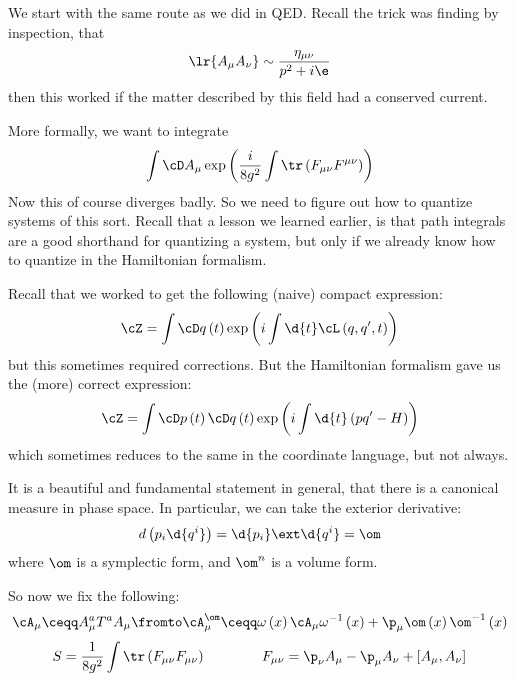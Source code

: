 \documentclass{booc}
\begin{document}
We start with the same route as we did in QED.
Recall the trick was finding by inspection, that 
\begin{equation}
\lr{A_\mu A_\nu} \sim
\frac{\eta_{\mu\nu}}{p^2 + i\e}
\end{equation}
then this worked if the matter described by this field 
had a conserved current.

More formally, we want to integrate
\begin{equation}
\int \cD A_\mu \exp\left( 
\frac{i}{8g^2} \int \tr\left( F_{\mu\nu}F^{\mu\nu} \right)
\right)
\end{equation}
Now this of course diverges badly. 
So we need to figure out how to quantize systems of this sort. 
Recall that a lesson we learned earlier, is that path integrals
are a good shorthand for quantizing a system,
but only if we already know how to quantize in the Hamiltonian formalism.

Recall that we worked to get the following (naive) compact expression:
\begin{equation}
\cZ = \int \cD q\left( t \right)
\exp\left( i\int \d{t} \cL \left( q , q' , t \right) \right)
\end{equation}
but this sometimes required corrections. 
But the Hamiltonian formalism gave us the (more) correct expression:
\begin{equation}
\cZ = 
\int \cD p\left( t \right) \cD q\left( t \right)
\exp\left( i\int \d{t} \left( p q' - H \right) \right)
\end{equation}
which sometimes reduces to the same in the coordinate language, but not always.

\begin{rmk}
It is a beautiful and fundamental statement in general,
that there is a canonical measure in phase space.
In particular, we can take the exterior derivative:
\begin{equation}
d\left( p_i \d{q^i} \right) = \d{p_i} \ext \d{q^i} = \om
\end{equation}
where $\om$ is a symplectic form, and
$\om^n$ is a volume form.
\end{rmk}

So now we fix the following:
\begin{equation}
\cA_\mu \ceqq A_\mu^a T^a
A_\mu \fromto \cA_\mu^\om \ceqq
\omega\left( x \right) \cA_\mu \omega^{-1}\left( x \right) + 
\p_\mu \om\left( x \right)\om^{-1}\left( x \right)
\end{equation}
\begin{equation}
S = \frac{1}{8g^2}\int \tr\left( F_{\mu\nu}F_{\mu\nu} \right)
\qquad\qquad
F_{\mu\nu}= 
\p_\nu A_\mu - \p_\mu A_\nu + 
\left[ A_\mu , A_\nu\right]
\end{equation}
\end{document}
